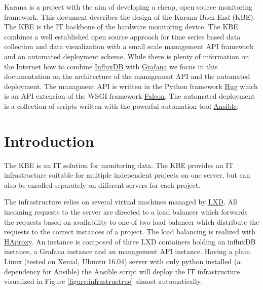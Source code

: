 \documentclass[draft=false,
10pt, %
a4paper, %
oneside, %
headinclude,footinclude, %
]{scrartcl}
\begin{document}
Karana is a project with the aim of developing a cheap, open source monitoring framework. This document describes the design of the Karana Back End (KBE). The KBE is the IT backbone of the hardware monitoring device. The KBE combines a well established open source approach for time series based data collection and data visualization with a small scale management API framework and an automated deployment scheme. While there is plenty of information on the Internet how to combine \href{https://www.influxdata.com/}{InfluxDB} with \href{http://grafana.org/}{Grafana} we focus in this documentation on the architecture of the management API and the automated deployment. The managment API is written in the Python framework \href{http://www.hug.rest/}{Hug} which is an API extension of the WSGI framework \href{http://falconframework.org/}{Falcon}. The automated deployment is a collection of scripts written with the powerful automation tool \href{https://www.ansible.com}{Ansible}. 

{\let\thefootnote\relax{}}



\newpage %


\section{Introduction}

The KBE is an IT solution for monitoring data. The KBE provides an IT infrastructure suitable for multiple independent projects on one server, but can also be enrolled separately on different servers for each project. 

The infrastructure relies on several virtual machines managed by \href{https://linuxcontainers.org/lxd/}{LXD}. All incoming requests to the server are directed to a load balancer which forwards the requests based on availability to one of two load balancer which distribute the requests to the correct instances of a project. The load balancing is realized with \href{http://www.haproxy.org/}{HAproxy}. An instance is composed of three LXD containers holding an influxDB instance, a Grafana instance and an management API instance. Having a plain Linux (tested on Xenial, Ubuntu 16.04) server with only python installed (a dependency for Ansible) the Ansible script will deploy the IT infrastructure visualized in Figure \ref{figure:infrastructrue} almost automatically. 
\end{document}
